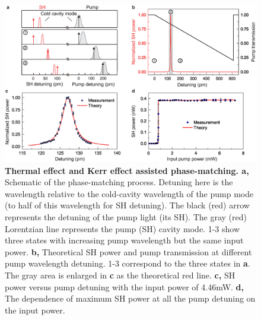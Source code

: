 \documentclass[a4paper,8pt,hyperref, twocolumn, aps, prl]{article}
\begin{document}
\begin{figure}[!ht]
\centering
\includegraphics[width=17cm]{try_ed3.eps}
\caption{\textbf{Thermal effect and Kerr effect assisted phase-matching. a, }Schematic of the phase-matching process. Detuning here is the wavelength relative to the cold-cavity wavelength of the pump mode (to half of this wavelength for SH detuning). The black (red) arrow represents the detuning of the pump light (its SH). The gray (red) Lorentzian line represents the pump (SH) cavity mode. 1-3 show three states with increasing pump wavelength but the same input power. \textbf{b, }Theoretical SH power and pump transmission at different pump wavelength detuning. 1-3 correspond to the three states in \textbf{a}. The gray area is enlarged in \textbf{c} as the theoretical red line. \textbf{c, }SH power versus pump detuning with the input power of 4.46mW. \textbf{d, }The dependence of maximum SH power at all the pump detuning on the input power.}
\label{pic:Fig2}
\end{figure}
\end{document}

